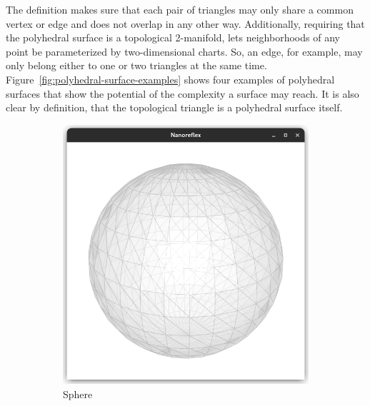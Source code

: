 \documentclass{stdlocal}
\begin{document}
  \noindent
  The definition makes sure that each pair of triangles may only share a common vertex or edge and does not overlap in any other way.
  Additionally, requiring that the polyhedral surface is a topological 2-manifold, lets neighborhoods of any point be parameterized by two-dimensional charts.
  So, an edge, for example, may only belong either to one or two triangles at the same time.
  Figure~\ref{fig:polyhedral-surface-examples} shows four examples of polyhedral surfaces that show the potential of the complexity a surface may reach.
  It is also clear by definition, that the topological triangle is a polyhedral surface itself.


  \begin{figure}
    \centering
    \begin{subfigure}[b]{0.23\linewidth}
      \centering
      \includegraphics[width=\linewidth,trim={25px 20 25 50},clip]{images/polyhedral-surface-sphere.png}
      \caption{Sphere}
    \end{subfigure}
    \hfill
    \begin{subfigure}[b]{0.23\linewidth}
      \centering

\end{subfigure}
\end{figure}
\end{document}
